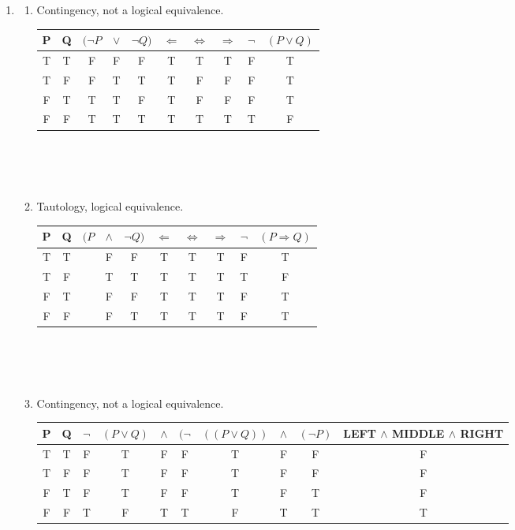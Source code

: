 \documentclass[10pt]{article}
\theoremstyle{plain}
\theoremstyle{definition}
\begin{document}
\maketitle

\begin{enumerate}

\item

\begin{enumerate}


\item Contingency, not a logical equivalence. \\
\begin{tabular}{cc|cccc|c|ccc}
P & Q & $( \neg P$ & $\vee$ & $\neg Q)$ & $\Leftarrow$ & $\Leftrightarrow$ & $\Rightarrow$ & $\neg$&$(P \vee Q)$ \\
\hline
T & T & F & F & F & T & T & T & F & T\\
T & F & F & T & T & T & F & F & F & T\\
F & T & T & T & F & T & F & F & F & T\\
F & F & T & T & T & T & T & T & T & F\\

\end{tabular}\\\\\

\item Tautology, logical equivalence. \\
\begin{tabular}{cc|cccc|c|ccc}
P & Q & $(  P$ & $\wedge$ & $\neg Q)$ & $\Leftarrow$ & $\Leftrightarrow$ & $\Rightarrow$ & $\neg$&$(P \Rightarrow Q)$ \\
\hline
T & T &  & F & F & T & T & T & F & T\\
T & F &  & T & T & T & T & T & T & F\\
F & T &  & F & F & T & T & T & F & T\\
F & F &  & F & T & T & T & T & F & T\\

\end{tabular}\\\\\

\item Contingency, not a logical equivalence. 

\begin{tabular}{cc|ccccccc|c}
P & Q & $\neg$ & $(  P\vee Q)$ & $ \wedge$ &  $(\neg$& $((  P\vee Q))$ & $ \wedge$ & $ (\neg P)$ & LEFT $\wedge$ MIDDLE $\wedge$ RIGHT \\
\hline
T & T & F & T & F & F & T & F & F & F\\
T & F & F & T & F & F & T & F & F & F\\
F & T & F & T & F & F & T & F & T & F\\
F & F & T & F & T & T & F & T & T & T\\


\end{tabular}
\end{enumerate}
\end{enumerate}
\end{document}
